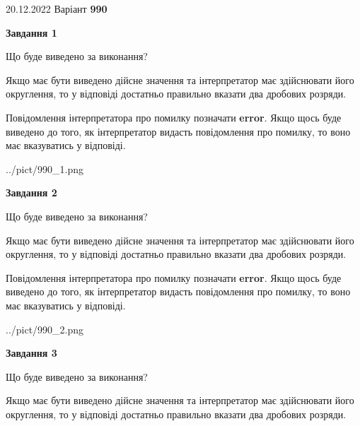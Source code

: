 \documentclass[12pt, ukrainian]{article}
\begin{document}
{20.12.2022 Варіант \No \textbf { 990 }\par}
{
\begin {Large}

{\begin {center}\textbf{Завдання 1}\end {center}}\par
Що буде виведено за виконання? \par

Якщо має бути виведено дійсне значення та інтерпретатор має здійснювати його округлення, 
то у відповіді достатньо правильно вказати два дробових розряди.

Повідомлення інтерпретатора про помилку позначати \textbf{error}.
Якщо щось буде виведено до того, як інтерпретатор видасть повідомлення про помилку, 
то воно має вказуватись у відповіді. \par

\begin{center}
	{../pict/990_1.png}
\end{center}
\newpage

{\begin {center}\textbf{Завдання 2}\end {center}}\par
Що буде виведено за виконання? \par

Якщо має бути виведено дійсне значення та інтерпретатор має здійснювати його округлення, 
то у відповіді достатньо правильно вказати два дробових розряди.

Повідомлення інтерпретатора про помилку позначати \textbf{error}.
Якщо щось буде виведено до того, як інтерпретатор видасть повідомлення про помилку, 
то воно має вказуватись у відповіді. \par

\begin{center}
	{../pict/990_2.png}
\end{center}
\newpage

{\begin {center}\textbf{Завдання 3}\end {center}}\par
Що буде виведено за виконання? \par

Якщо має бути виведено дійсне значення та інтерпретатор має здійснювати його округлення, 
то у відповіді достатньо правильно вказати два дробових розряди.


\end{Large}}
\end{document}
